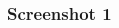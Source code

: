 \documentclass{beamer}
\begin{document}
\begin{frame}
\frametitle{Screenshot 1}
\begin{columns}
  \begin{column}{0.25\textwidth}
    \begin{figure}
    \raggedleft
    \setlength{\fboxsep}{0pt}
    \setlength{\fboxrule}{0.1pt}

\end{figure}
\end{column}
\end{columns}
\end{frame}
\end{document}
